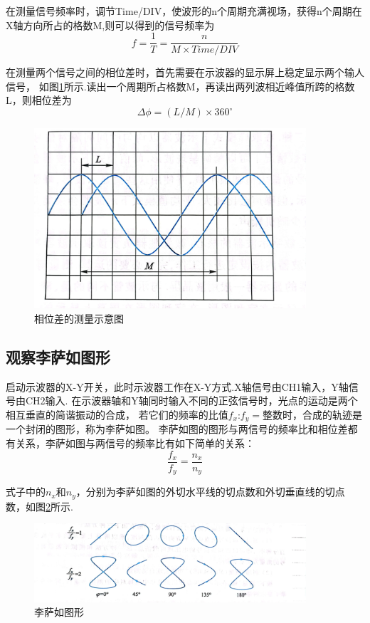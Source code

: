 \documentclass{ctexart}
\begin{document}
  在测量信号频率时，调节Time/DIV，使波形的n个周期充满视场，获得n个周期在X轴方向所占的格数M,则可以得到的信号频率为
  \begin{equation}
    f=\frac{1}{T}=\frac{n}{M\times Time/DIV}
  \end{equation}

  在测量两个信号之间的相位差时，首先需要在示波器的显示屏上稳定显示两个输人信号，
  如图\ref{xiangweichaceliang}所示.读出一个周期所占格数M，再读出两列波相近峰值所跨的格数L，则相位差为
  \begin{equation}
    \Delta \phi =(L/M)\times 360^{\circ} 
  \end{equation}

  \begin{figure}[bt]\label{xiangweichaceliang}
    \centering
    \includegraphics[width=0.9\textwidth,height=0.3\textheight]{xiangweichaceliang.jpg}
    \caption{相位差的测量示意图}
  \end{figure}

  \subsection{观察李萨如图形}
  启动示波器的X-Y开关，此时示波器工作在X-Y方式.X轴信号由CH1输入，Y轴信号由CH2输入.
  在示波器轴和Y轴同时输入不同的正弦信号时，光点的运动是两个相互垂直的简谐振动的合成，
  若它们的频率的比值$f_{x}\mbox{:}f_{y}=\mbox{整数}$时，合成的轨迹是一个封闭的图形，称为李萨如图。
  李萨如图的图形与两信号的频率比和相位差都有关系，李萨如图与两信号的频率比有如下简单的关系：
  \begin{equation}\label{guanxi1}
    \frac{f_{x}}{f_{y}}=\frac{n_{x}}{n_{y}}
  \end{equation}

  式子中的$n_{x}\mbox{和}n_{y}$，分别为李萨如图的外切水平线的切点数和外切垂直线的切点数，如图\ref{lisaru}所示.
  \begin{figure}[H]\label{lisaru}
    \centering
    \includegraphics[width=0.9\textwidth,height=0.4\textheight]{lisaru.jpg}
    \caption{李萨如图形}
  \end{figure}
  
\end{document}
